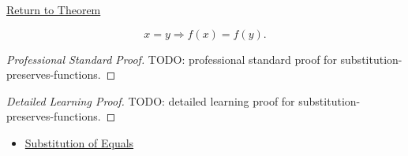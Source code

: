 \newpage
{}
\label{prf:substitution-preserves-functions}

\begin{remark*}[Return]
\hyperref[prop:substitution-preserves-functions]{Return to Theorem}
\end{remark*}

\begin{proposition*}
\[
x=y \Longrightarrow f(x)=f(y).
\]
\end{proposition*}

\begin{proof}[Professional Standard Proof]
\LRAProofBodyStart
TODO: professional standard proof for substitution-preserves-functions.
\end{proof}

\begin{proof}[Detailed Learning Proof]
\LRAProofBodyStart
TODO: detailed learning proof for substitution-preserves-functions.
\end{proof}

\begin{remark*}
\end{remark*}

\begin{dependencies}
\begin{itemize}
  \item \hyperref[ax:equality-substitution]{Substitution of Equals}
\end{itemize}
\end{dependencies}

\clearpage
